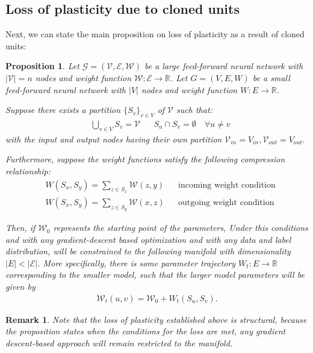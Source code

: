 \documentclass[11pt]{article}
\newcommand{\R}{\mathbb{R}}
\newtheorem{proposition}{Proposition}[section]
\newtheorem{remark}{Remark}[section]
\begin{document}
\subsection{Loss of plasticity due to cloned units }
Next, we can state the main proposition on loss of plasticity as a result of cloned units:  

\begin{proposition}
    Let $\mathcal{G} = (\mathcal{V}, \mathcal{E}, \mathcal{W})$ be a large feed-forward neural network with $|\mathcal{V}| = n$ nodes and weight function $\mathcal{W}: \mathcal{E} \rightarrow \mathbb{R}$. Let $G = (V, E, W)$ be a small feed-forward neural network with $|V|$ nodes and weight function $W: E \rightarrow \R$.
    
    Suppose there exists a partition $\{S_v\}_{v \in V}$ of $\mathcal{V}$ such that:
    \begin{align*}
        &\bigcup_{v \in V} S_v = \mathcal{V} && S_u \cap S_v = \emptyset \quad \forall u \neq v
    \end{align*}
    with the input and output nodes having their own partition $\mathcal{V}_{in} = V_{in},\mathcal{V}_{out} = V_{out} . $
    
    Furthermore, suppose the weight functions satisfy the following compression relationship:
    \begin{align}
        &W(S_x,S_y ) = \sum_{z\in S_x}\mathcal{W}(z,y) && \text{incoming weight condition}  \\
        &W(S_x,S_y ) = \sum_{z\in S_y}\mathcal{W}(x,z) && \text{outgoing weight condition}
    \end{align}
    
    Then, if $\mathcal{W}_0$ represents the starting point of the parameters, Under this conditions and with any \emph{gradient-descent based optimization} and with \emph{any data and label distribution}, will be constrained to the following manifold with dimensionality $|E| < |\mathcal{E}|$. More specifically, there is some parameter trajectory $ W_t: E \to \R $ corresponding to the smaller model, such that the larger model parameters will be given by 
    \begin{align*}
        \mathcal{W}_t(u,v) =  \mathcal{W}_0 +  W_t(S_u,S_v) .
    \end{align*}
\end{proposition}

\begin{remark}
    Note that the loss of plasticity established above is \emph{structural}, because the proposition states when the conditions for the loss are met, any gradient descent-based approach will remain restricted to the manifold. 
\end{remark}
\end{document}
